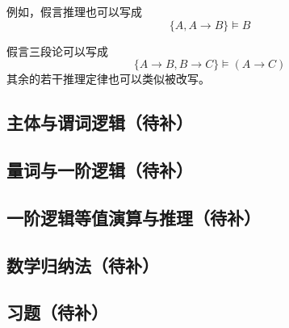 例如，假言推理也可以写成
$$\{A,A\rightarrow B\}\models B$$

假言三段论可以写成
$$\{A\rightarrow B,B\rightarrow C\}
\models(A\rightarrow C)$$
其余的若干推理定律也可以类似被改写。



\subsection{主体与谓词逻辑（待补）}
\subsection{量词与一阶逻辑（待补）}
\subsection{一阶逻辑等值演算与推理（待补）}
\subsection{数学归纳法（待补）}
\subsection{习题（待补）}